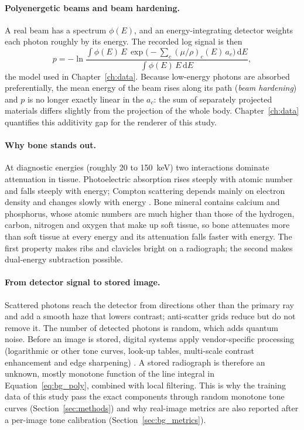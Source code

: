 \paragraph{Polyenergetic beams and beam hardening.} A real beam has a spectrum $\phi(E)$, and an energy-integrating detector weights each photon
roughly by its energy. The recorded log signal is then
\begin{equation}
p=-\ln\frac{\int \phi(E)\,E\,\exp\!\big(-\sum_c (\mu/\rho)_c(E)\,a_c\big)\,\mathrm{d}E}{\int \phi(E)\,E\,\mathrm{d}E},
\label{eq:bg_poly}
\end{equation}
the model used in Chapter~\ref{ch:data}. Because low-energy photons are absorbed preferentially, the mean energy of the beam rises along its path
(\emph{beam hardening}) and $p$ is no longer exactly linear in the $a_c$: the sum of separately projected materials differs slightly from the
projection of the whole body. Chapter~\ref{ch:data} quantifies this additivity gap for the renderer of this study.

\paragraph{Why bone stands out.} At diagnostic energies (roughly 20 to 150~keV) two interactions dominate attenuation in tissue. Photoelectric
absorption rises steeply with atomic number and falls steeply with energy; Compton scattering depends mainly on electron density and changes
slowly with energy \citep{bushberg2020essential}.
Bone mineral contains calcium and phosphorus, whose atomic numbers are much higher than those of the hydrogen, carbon, nitrogen and oxygen that make
up soft tissue, so bone attenuates more than soft tissue at every energy and its attenuation falls faster with energy. The first property makes
ribs and clavicles bright on a radiograph; the second makes dual-energy subtraction possible.

\paragraph{From detector signal to stored image.} Scattered photons reach the detector from directions other than the primary ray and add a
smooth haze that lowers contrast; anti-scatter grids reduce but do not remove it. The number of detected photons is random, which adds quantum
noise. Before an image is stored, digital systems apply vendor-specific processing (logarithmic or other tone curves, look-up tables, multi-scale
contrast enhancement and edge sharpening) \citep{prokop2003processing,schaeferprokop2008digital}. A stored radiograph is therefore
an unknown, mostly monotone function of the line integral in Equation~\eqref{eq:bg_poly}, combined with local filtering. This is why the training
data of this study pass the exact components through random monotone tone curves (Section~\ref{sec:methods}) and why real-image metrics are also
reported after a per-image tone calibration (Section~\ref{sec:bg_metrics}).

